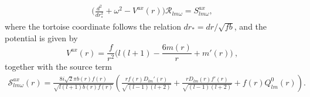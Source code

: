 \documentclass[11pt]{article}
\begin{document}
\begin{align}
    \Big(\frac{d^{2}}{dr_{*}^{2}}+\omega^{2}-V^{ax}(r)\Big)\mathcal{R}_{lm\omega} = S^{ax}_{lm\omega}, 
\end{align}
where the tortoise coordinate follows the relation $dr_{*}=dr/\sqrt{fb}$, and the potential is given by
\begin{equation}
V^{ax}(r) = \dfrac{f}{r^2}\Big(l(l+1) - \dfrac{6m(r)}{r} + m'(r)  \Big)\ ,
\end{equation}
together with the source term
\begin{align}
\label{eq:Source}
\mathcal{S}^{ax}_{lm\omega}(r) = \frac{8 i \sqrt{2} \pi  b(r) f(r)}{\sqrt{l (l+1) b(r)f(r)}} \left(\frac{r f(r) D_{lm}'(r)}{\sqrt{(l-1)(l+2)}}+\frac{r D_{lm}(r) f'(r)}{\sqrt{(l-1) (l+2)}}+f(r) Q^{0}_{lm}(r)\right).
\end{align}
\end{document}
